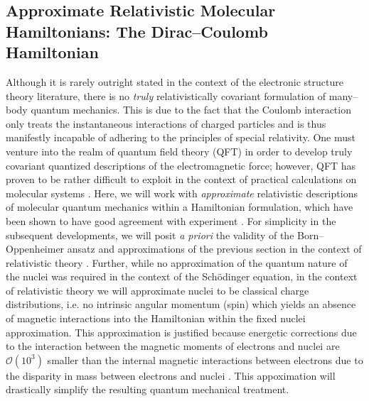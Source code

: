 \subsection{Approximate Relativistic  Molecular Hamiltonians: The Dirac--Coulomb Hamiltonian}

Although it is rarely outright stated in the context of the electronic structure theory
literature, there is no \emph{truly} relativistically covariant formulation of many--body quantum 
mechanics. This is due to the fact that the Coulomb interaction only treats the instantaneous interactions
of charged particles and is thus manifestly incapable of adhering to the principles of special relativity.
One must venture into the realm of quantum field theory (QFT) in order to develop truly covariant quantized 
descriptions of the electromagnetic force; however, QFT has proven to be rather difficult to exploit in
the context of practical calculations on molecular systems . Here, we will work with
\emph{approximate} relativistic descriptions of molecular quantum mechanics within a Hamiltonian
formulation, which have been shown to have good agreement with experiment .
For simplicity in the subsequent developments, we will posit \emph{a priori} the validity of the 
Born--Oppenheimer ansatz and approximations of the previous section in the context of relativistic
theory . Further, while no approximation of the quantum nature of the nuclei was required in the 
context of the Sch\"{o}dinger equation, in the context of relativistic theory we will approximate
nuclei to be classical charge distributions, i.e. no intrinsic angular momentum (spin) which
yields an absence of magnetic interactions into the Hamiltonian within the fixed nuclei approximation.
This approximation is justified because energetic corrections due to the interaction between
the magnetic moments of electrons and nuclei are $\mathcal{O}(10^3)$ smaller than the internal
magnetic interactions between electrons due to the disparity in mass between electrons and nuclei .
This appoximation will drastically simplify the resulting quantum mechanical treatment.

